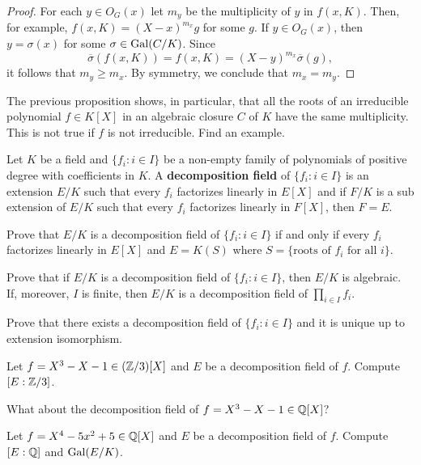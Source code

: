 \begin{proof}
    For each $y\in O_G(x)$ let $m_y$ be the multiplicity
    of $y$ in $f(x,K)$. 
    Then, for example,
    $f(x,K)=(X-x)^{m_x}g$ for some $g$. If $y\in O_G(x)$, 
    then $y=\sigma(x)$ for some $\sigma\in\operatorname{Gal}(C/K)$. Since
    \[
    \overline{\sigma}(f(x,K))=f(x,K)=(X-y)^{m_x}\overline{\sigma}(g), 
    \]
    it follows that $m_y\geq m_x$. By symmetry, 
    we conclude that $m_x=m_y$. 
\end{proof}

The previous proposition shows, in particular, 
that all the roots of 
an irreducible polynomial $f\in K[X]$ 
in an algebraic closure $C$ of $K$
have the same multiplicity. This is  
not true if $f$ is not irreducible. Find an example.



\begin{definition}
    Let $K$ be a field and $\{f_i:i\in I\}$ be a non-empty 
    family of polynomials of positive degree
    with coefficients in $K$. A \textbf{decomposition field} 
    of $\{f_i:i\in I\}$ is an extension $E/K$
    such that every $f_i$ factorizes linearly in $E[X]$ and 
    if $F/K$ is a sub extension of $E/K$ such that every $f_i$ 
    factorizes linearly in $F[X]$, then $F=E$. 
\end{definition}

\begin{exercise}
    Prove that $E/K$ is a decomposition field of
    $\{f_i:i\in I\}$ if and only if every $f_i$ factorizes linearly 
    in $E[X]$ and $E=K(S)$ where $S=\{\text{roots of $f_i$ for all $i$}\}$. 
\end{exercise}

\begin{exercise}
    Prove that if $E/K$ is a decomposition field
    of $\{f_i:i\in I\}$, then $E/K$ is algebraic. If, moreover, 
    $I$ is finite, then $E/K$ is a decomposition field
    of $\prod_{i\in I}f_i$. 
\end{exercise}

\begin{exercise}
    Prove that 
    there exists a decomposition field of $\{f_i:i\in I\}$ 
    and it is unique up to extension isomorphism. 
\end{exercise}

\begin{exercise}
    Let $f=X^3-X-1\in (\mathbb{Z}/3)[X]$ and $E$ be a decomposition field of $f$. 
    Compute $[E:\mathbb{Z}/3]$. 
\end{exercise}

What about the decomposition field of $f=X^3-X-1\in \mathbb{Q}[X]$?

\begin{exercise}
    Let $f=X^4-5x^2+5\in \mathbb{Q}[X]$ and $E$ be a decomposition field of $f$. 
    Compute $[E:\mathbb{Q}]$ and $\operatorname{Gal}(E/K)$. 
\end{exercise}



